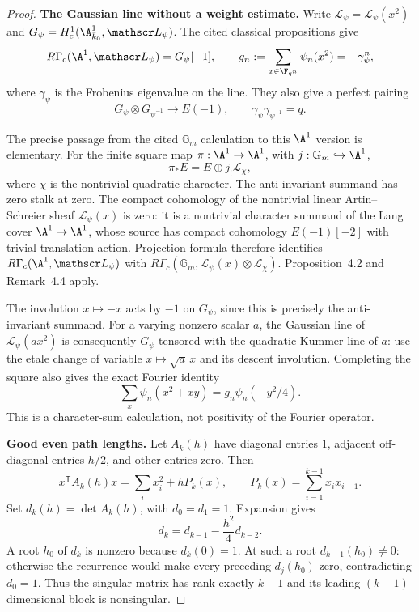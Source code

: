 \begin{proof}
\par\smallskip\noindent\textbf{The Gaussian line without a weight estimate.}\quad
Write $\mathscr L_\psi=\mathcal L_\psi(x^2)$ and
$G_\psi=H_c^1(\A^1_{\bar k_0},\mathscr L_\psi)$.
The cited classical propositions give
\begin{equation}\label{eq:gaussline}
 R\Gamma_c(\A^1,\mathscr L_\psi)=G_\psi[-1],
 \qquad
 g_n:=\sum_{x\in\F_{q^n}}\psi_n(x^2)=-\gamma_\psi^n,
\end{equation}
where $\gamma_\psi$ is the Frobenius eigenvalue on the line.
They also give a perfect pairing
\begin{equation}\label{eq:gausspair}
 G_\psi\otimes G_{\psi^{-1}}\longrightarrow E(-1),
 \qquad \gamma_\psi\gamma_{\psi^{-1}}=q.
\end{equation}

The precise passage from the cited $\mathbb G_m$ calculation to this
$\A^1$ version is elementary. For the finite square map
$\pi:\A^1\to\A^1$, with $j:\mathbb G_m\hookrightarrow\A^1$,
\[
 \pi_*E=E\oplus j_!\mathcal L_\chi,
\]
where $\chi$ is the nontrivial quadratic character. The
anti-invariant summand has zero stalk at zero. The compact
cohomology of the nontrivial linear Artin--Schreier sheaf
$\mathcal L_\psi(x)$ is zero: it is a nontrivial character
summand of the Lang cover $\A^1\to\A^1$, whose source has
compact cohomology $E(-1)[-2]$ with trivial translation action.
Projection formula therefore identifies
$R\Gamma_c(\A^1,\mathscr L_\psi)$ with
$R\Gamma_c(\mathbb G_m,\mathcal L_\psi(x)\otimes\mathcal L_\chi)$.
Proposition~4.2 and Remark~4.4 apply.

The involution $x\mapsto-x$ acts by $-1$ on $G_\psi$,
since this is precisely the anti-invariant summand. For a
varying nonzero scalar $a$, the Gaussian line of
$\mathcal L_\psi(ax^2)$ is consequently $G_\psi$ tensored with
the quadratic Kummer line of $a$: use the etale change of
variable $x\mapsto\sqrt a\,x$ and its descent involution.
Completing the square also gives the exact Fourier identity
\[
 \sum_x\psi_n(x^2+xy)=g_n\psi_n(-y^2/4).
\]
This is a character-sum calculation, not positivity of the
Fourier operator.

\par\smallskip\noindent\textbf{Good even path lengths.}\quad
Let $A_k(h)$ have diagonal entries $1$, adjacent off-diagonal
entries $h/2$, and other entries zero. Then
\[
 x^{\mathsf T}A_k(h)x=\sum_i x_i^2+hP_k(x),\qquad
 P_k(x)=\sum_{i=1}^{k-1}x_ix_{i+1}.
\]
Set $d_k(h)=\det A_k(h)$, with $d_0=d_1=1$. Expansion gives
\begin{equation}\label{eq:gaussdetrec}
 d_k=d_{k-1}-\frac{h^2}{4}d_{k-2}.
\end{equation}
A root $h_0$ of $d_k$ is nonzero because $d_k(0)=1$.
At such a root $d_{k-1}(h_0)\ne0$: otherwise the recurrence
would make every preceding $d_j(h_0)$ zero, contradicting
$d_0=1$. Thus the singular matrix has rank exactly $k-1$
and its leading $(k-1)$-dimensional block is nonsingular.


\end{proof}
